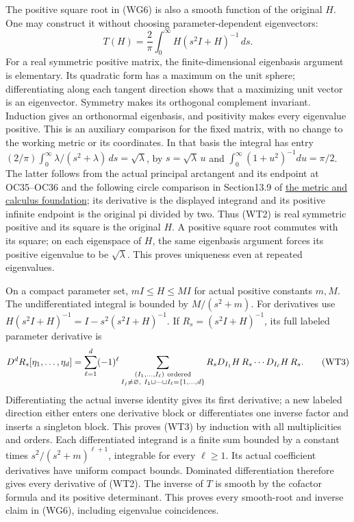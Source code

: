 \documentclass[
  11pt,
]{article}
\begin{document}
The positive square root in (WG6) is also a smooth function of the
original \(H\). One may construct it without choosing
parameter-dependent eigenvectors: \[
 T(H)=\frac2\pi\int_0^\infty H(s^2I+H)^{-1}\,ds.
 \tag{WT2}
\] For a real symmetric positive matrix, the finite-dimensional
eigenbasis argument is elementary. Its quadratic form has a maximum on
the unit sphere; differentiating along each tangent direction shows that
a maximizing unit vector is an eigenvector. Symmetry makes its
orthogonal complement invariant. Induction gives an orthonormal
eigenbasis, and positivity makes every eigenvalue positive. This is an
auxiliary comparison for the fixed matrix, with no change to the working
metric or its coordinates. In that basis the integral has entry
\((2/\pi)\int_0^\infty\lambda/(s^2+\lambda)\,ds=\sqrt\lambda\), by
\(s=\sqrt\lambda\,u\) and \(\int_0^\infty(1+u^2)^{-1}du=\pi/2\). The
latter follows from the actual principal arctangent and its endpoint at
OC35--OC36 and the following circle comparison in Section13.9 of
\href{metric-foundation-bridges.pdf}{the metric and calculus foundation};
its derivative is the displayed integrand and its positive infinite
endpoint is the original pi divided by two. Thus (WT2) is real symmetric
positive and its square is the original \(H\). A positive square root
commutes with its square; on each eigenspace of \(H\), the same
eigenbasis argument forces its positive eigenvalue to be
\(\sqrt\lambda\). This proves uniqueness even at repeated eigenvalues.

On a compact parameter set, \(mI\leq H\leq MI\) for actual positive
constants \(m,M\). The undifferentiated integral is bounded by
\(M/(s^2+m)\). For derivatives use
\(H(s^2I+H)^{-1}=I-s^2(s^2I+H)^{-1}\). If \(R_s=(s^2I+H)^{-1}\), its
full labeled parameter derivative is \[
 D^dR_s[\eta_1,\ldots,\eta_d]
 =\sum_{\ell=1}^d(-1)^\ell
   \sum_{\substack{(I_1,\ldots,I_\ell)\ {\rm ordered}\\
          I_j\ne\varnothing,\ I_1\sqcup\cdots\sqcup I_\ell=\{1,\ldots,d\}}}
 R_sD_{I_1}H\,R_s\cdots D_{I_\ell}H\,R_s .
 \tag{WT3}
\] Differentiating the actual inverse identity gives its first
derivative; a new labeled direction either enters one derivative block
or differentiates one inverse factor and inserts a singleton block. This
proves (WT3) by induction with all multiplicities and orders. Each
differentiated integrand is a finite sum bounded by a constant times
\(s^2/(s^2+m)^{\ell+1}\), integrable for every \(\ell\geq1\). Its actual
coefficient derivatives have uniform compact bounds. Dominated
differentiation therefore gives every derivative of (WT2). The inverse
of \(T\) is smooth by the cofactor formula and its positive determinant.
This proves every smooth-root and inverse claim in (WG6), including
eigenvalue coincidences.
\end{document}
